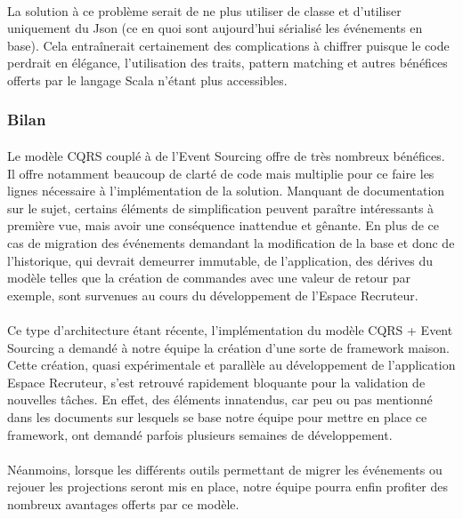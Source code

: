 \paragraph{}
La solution à ce problème serait de ne plus utiliser de classe et d'utiliser uniquement du Json (ce en quoi sont aujourd'hui sérialisé les événements en base).
Cela entraînerait certainement des complications à chiffrer puisque le code perdrait en élégance, l'utilisation des traits, pattern matching et autres bénéfices offerts par le langage Scala n'étant plus accessibles.
\subsubsection{Bilan}
\paragraph{}
Le modèle CQRS couplé à de l'Event Sourcing offre de très nombreux bénéfices.
Il offre notamment beaucoup de clarté de code mais multiplie pour ce faire les lignes nécessaire à l'implémentation de la solution.
Manquant de documentation sur le sujet, certains éléments de simplification peuvent paraître intéressants à première vue, mais avoir une conséquence inattendue et gênante.
En plus de ce cas de migration des événements demandant la modification de la base et donc de l'historique, qui devrait demeurrer immutable, de l'application, des dérives du modèle telles que la création de commandes avec une valeur de retour par exemple, sont survenues au cours du développement de l'Espace Recruteur.
\paragraph{}
Ce type d'architecture étant récente, l'implémentation du modèle CQRS + Event Sourcing a demandé à notre équipe la création d'une sorte de framework maison.
Cette création, quasi expérimentale et parallèle au développement de l'application Espace Recruteur, s'est retrouvé rapidement bloquante pour la validation de nouvelles tâches.
En effet, des éléments innatendus, car peu ou pas mentionné dans les documents sur lesquels se base notre équipe pour mettre en place ce framework, ont demandé parfois plusieurs semaines de développement.
\paragraph{}
Néanmoins, lorsque les différents outils permettant de migrer les événements ou rejouer les projections seront mis en place, notre équipe pourra enfin profiter des nombreux avantages offerts par ce modèle.
